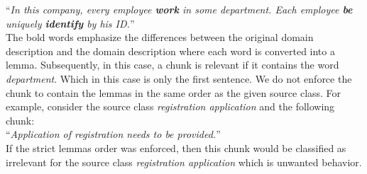 \noindent{}``\textit{In this company, every employee \textbf{work} in some department. Each employee \textbf{be} uniquely \textbf{identify} by his ID.}'' \\

\noindent{}The bold words emphasize the differences between the original domain description and the domain description where each word is converted into a lemma. Subsequently, in this case, a chunk is relevant if it contains the word \textit{department}. Which in this case is only the first sentence. We do not enforce the chunk to contain the lemmas in the same order as the given source class. For example, consider the source class \textit{registration application} and the following chunk: \\

\noindent{}``\textit{Application of registration needs to be provided.}'' \\

\noindent{}If the strict lemmas order was enforced, then this chunk would be classified as irrelevant for the source class \textit{registration application} which is unwanted behavior.
